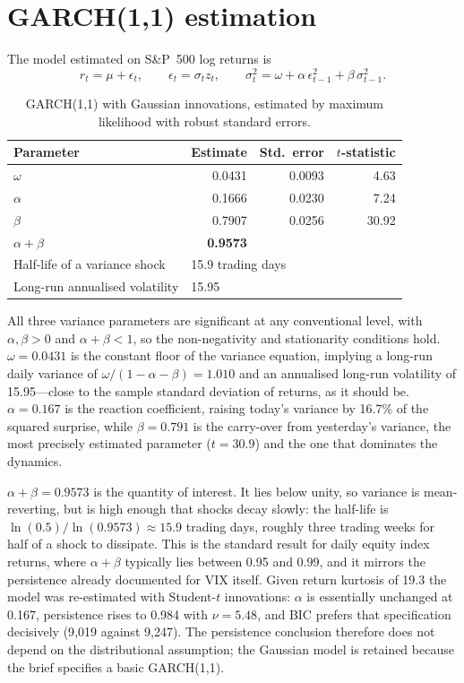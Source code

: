 \documentclass[10pt,a4paper]{article}
\begin{document}
\section{GARCH(1,1) estimation}

The model estimated on S\&P~500 log returns is
\begin{equation*}
r_t = \mu + \epsilon_t, \qquad \epsilon_t = \sigma_t z_t, \qquad
\sigma_t^2 = \omega + \alpha\,\epsilon_{t-1}^2 + \beta\,\sigma_{t-1}^2 .
\end{equation*}

\begin{table}[!htb]
\centering\small
\caption{GARCH(1,1) with Gaussian innovations, estimated by maximum likelihood with
robust standard errors.}
\begin{tabular}{lrrr}
\toprule
Parameter & Estimate & Std.\ error & $t$-statistic \\
\midrule
$\omega$          & 0.0431 & 0.0093 & 4.63 \\
$\alpha$          & 0.1666 & 0.0230 & 7.24 \\
$\beta$           & 0.7907 & 0.0256 & 30.92 \\
\midrule
$\alpha + \beta$  & \textbf{0.9573} & & \\
Half-life of a variance shock & \multicolumn{3}{l}{15.9 trading days} \\
Long-run annualised volatility & \multicolumn{3}{l}{15.95} \\
\bottomrule
\end{tabular}
\end{table}

All three variance parameters are significant at any conventional level, with
$\alpha, \beta > 0$ and $\alpha + \beta < 1$, so the non-negativity and stationarity
conditions hold. $\omega = 0.0431$ is the constant floor of the variance equation, implying
a long-run daily variance of $\omega/(1-\alpha-\beta) = 1.010$ and an annualised long-run
volatility of 15.95---close to the sample standard deviation of returns, as it should be.
$\alpha = 0.167$ is the reaction coefficient, raising today's variance by 16.7\% of the
squared surprise, while $\beta = 0.791$ is the carry-over from yesterday's variance, the
most precisely estimated parameter ($t = 30.9$) and the one that dominates the dynamics.

$\alpha + \beta = 0.9573$ is the quantity of interest. It lies below unity, so variance
is mean-reverting, but is high enough that shocks decay slowly: the half-life is
$\ln(0.5)/\ln(0.9573) \approx 15.9$ trading days, roughly three trading weeks for half
of a shock to dissipate. This is the standard result for daily equity index returns,
where $\alpha+\beta$ typically lies between 0.95 and 0.99, and it mirrors the
persistence already documented for VIX itself. Given return kurtosis of 19.3 the model
was re-estimated with Student-$t$ innovations: $\alpha$ is essentially unchanged at
0.167, persistence rises to 0.984 with $\nu = 5.48$, and BIC prefers that specification
decisively (9{,}019 against 9{,}247). The persistence conclusion therefore does not
depend on the distributional assumption; the Gaussian model is retained because the
brief specifies a basic GARCH(1,1).
\end{document}
